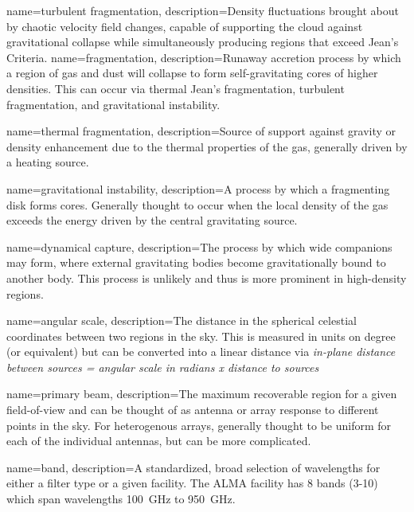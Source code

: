 {
{
        name=turbulent fragmentation,
        description={Density fluctuations brought about by chaotic velocity field changes, capable of supporting the cloud against gravitational collapse while simultaneously producing regions that exceed Jean's Criteria.}
}
{
        name=fragmentation,
        description={Runaway accretion process by which a region of gas and dust will collapse to form self-gravitating cores of higher densities. This can occur via thermal Jean's fragmentation, turbulent fragmentation, and gravitational instability.}
}

{
        name=thermal fragmentation,
        description={Source of support against gravity or density enhancement due to the thermal properties of the gas, generally driven by a heating source.}
}

{
        name=gravitational instability,
        description={A process by which  a fragmenting disk forms cores. Generally thought to occur when the local density of the gas exceeds the energy driven by the central gravitating source.}
}

{
        name=dynamical capture,
        description={The process by which wide companions may form, where external gravitating bodies become gravitationally bound to another body. This process is unlikely and thus is more prominent in high-density regions.}
}


{
        name=angular scale,
        description={The distance in the spherical celestial coordinates between two regions in the sky. This is measured in units on degree (or equivalent) but can be converted into a linear distance via \textit{in-plane distance between sources = angular scale in radians x distance to sources} }
}

{
        name=primary beam,
        description={The maximum recoverable region for a given field-of-view and can be thought of as antenna or array response to different points in the sky. For heterogenous arrays, generally thought to be uniform for each of the individual antennas, but can be more complicated.}
}


{
        name=band,
        description={A standardized, broad selection of wavelengths for either a filter type or a given facility. The ALMA facility has 8 bands (3-10) which span wavelengths 100~GHz to 950~GHz.}
}

}
